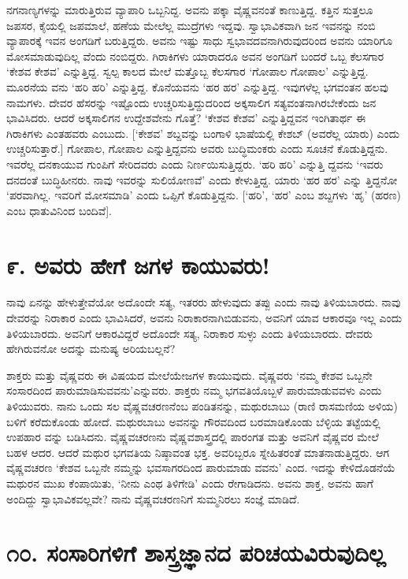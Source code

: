 ನಗನಾಣ್ಯಗಳನ್ನು ಮಾರುತ್ತಿರುವ ವ್ಯಾಪಾರಿ ಒಬ್ಬನಿದ್ದ. ಅವನು ಪಕ್ಕಾ ವೈಷ್ಣವನಂತೆ ಕಾಣುತ್ತಿದ್ದ. ಕತ್ತಿನ ಸುತ್ತಲೂ ಜಪಸರ, ಕೈಯಲ್ಲಿ ಜಪಮಾಲೆ, ಹಣೆಯ ಮೇಲೆಲ್ಲ ಮುದ್ರೆಗಳು ಇದ್ದವು. ಸ್ವಾಭಾವಿಕವಾಗಿ ಜನ ಇವನನ್ನು ನಂಬಿ ವ್ಯಾಪಾರಕ್ಕೆ ಇವನ ಅಂಗಡಿಗೆ ಬರುತ್ತಿದ್ದರು. ಅವನು ಇಷ್ಟು ಸಾಧು ಸ್ವಭಾವದವನಾಗಿರುವುದರಿಂದ ಅವನು ಯಾರಿಗೂ ಮೋಸಮಾಡುವುದಿಲ್ಲ ವೆಂದು ನಂಬಿದ್ದರು. ಗಿರಾಕಿಗಳು ಯಾರಾದರೂ ಅವನ ಅಂಗಡಿಗೆ ಬಂದರೆ ಒಬ್ಬ ಕೆಲಸಗಾರ ‘ಕೇಶವ ಕೇಶವ’ ಎನ್ನುತ್ತಿದ್ದ. ಸ್ವಲ್ಪ ಕಾಲದ ಮೇಲೆ ಮತ್ತೊಬ್ಬ ಕೆಲಸಗಾರ ‘ಗೋಪಾಲ ಗೋಪಾಲ’ ಎನ್ನುತ್ತಿದ್ದ. ಮೂರನೆಯ ವನು ‘ಹರಿ ಹರಿ’ ಎನ್ನುತ್ತಿದ್ದ. ಕೊನೆಯವನು ‘ಹರ ಹರ’ ಎನ್ನುತ್ತಿದ್ದ. ಇವುಗಳೆಲ್ಲ ಭಗವಂತನ ಹಲವು ನಾಮಗಳು. ದೇವರ ಹೆಸರನ್ನು ಇಷ್ಟೊಂದು ಉಚ್ಚರಿಸುತ್ತಿದ್ದುದರಿಂದ ಅಕ್ಕಸಾಲಿಗ ಸತ್ಯವಂತನಾಗಿರಬೇಕೆಂದು ಜನ ಭಾವಿಸಿದರು. ಆದರೆ ಅಕ್ಕಸಾಲಿಗನ ಉದ್ದೇಶವೇನು ಗೊತ್ತೆ? ‘ಕೇಶವ ಕೇಶವ’ ಎನ್ನುತ್ತಿದ್ದವನ ಇಂಗಿತಾರ್ಥ ಈ ಗಿರಾಕಿಗಳು ಎಂತಹವರು ಎಂಬುದು. [‘ಕೇಶವ’ ಶಬ್ದವನ್ನು ಬಂಗಾಳಿ ಭಾಷೆಯಲ್ಲಿ ಕೇಶಬ್ (ಅವರೆಲ್ಲ ಯಾರು) ಎಂದು ಉಚ್ಚರಿಸುತ್ತಾರೆ.] ಗೋಪಾಲ, ಗೋಪಾಲ ಎನ್ನುತ್ತಿದ್ದವನು ಅವರು ಬುದ್ಧಿಮಂಕರು ಎಂದು ಸೂಚನೆ ಕೊಡುತ್ತಿದ್ದನು. ಇವರೆಲ್ಲ ದನಕಾಯುವ ಗುಂಪಿಗೆ ಸೇರಿದವರು ಎಂದು ನಿರ್ಣಯಿಸುತ್ತಿದ್ದರು. ‘ಹರಿ ಹರಿ’ ಎನ್ನುತ್ತಿ ದ್ದವನು ‘ಇವರು ದನದಂತೆ ಬುದ್ಧಿಹೀನರು. ನಾವು ಇವರನ್ನು ಸುಲಿಯೋಣವೆ’ ಎಂದು ಕೇಳುತ್ತಿದ್ದ. ಯಾರು ‘ಹರ ಹರ’ ಎನ್ನು ತ್ತಿದ್ದನೋ ‘ಪರವಾಗಿಲ್ಲ. ಇವರಿಗೆ ಮೋಸಮಾಡಿ’ ಎಂದು ಒಪ್ಪಿಗೆ ಕೊಡುತ್ತಿದ್ದನು. [‘ಹರಿ’, ‘ಹರ’ ಎಂಬ ಶಬ್ದಗಳು ‘ಹೃ’ (ಹರಣ) ಎಂಬ ಧಾತುವಿನಿಂದ ಬಂದಿವೆ].


\section{\num{೯.} ಅವರು ಹೇಗೆ ಜಗಳ ಕಾಯುವರು!}

ನಾವು ಏನನ್ನು ಹೇಳುತ್ತೇವೆಯೋ ಅದೊಂದೇ ಸತ್ಯ, ಇತರರು ಹೇಳುವುದು ತಪ್ಪು ಎಂದು ನಾವು ತಿಳಿಯಬಾರದು. ನಾವು ದೇವರನ್ನು ನಿರಾಕಾರ ಎಂದು ಭಾವಿಸಿದರೆ, ಅವನು ನಿರಾಕಾರನಾಗಿಬಿಡುವನು, ಅವನಿಗೆ ಯಾವ ಆಕಾರವೂ ಇಲ್ಲ ಎಂದು ತಿಳಿಯಬಾರದು. ಅವನಿಗೆ ಆಕಾರವಿದ್ದರೆ ಅದೊಂದೇ ಸತ್ಯ, ನಿರಾಕಾರ ಸುಳ್ಳು ಎಂದು ತಿಳಿಯಬಾರದು. ದೇವರು ಹೇಗಿರುವನೋ ಅದನ್ನು ಮನುಷ್ಯ ಅರಿಯಬಲ್ಲನೆ?

ಶಾಕ್ತರು ಮತ್ತು ವೈಷ್ಣವರು ಈ ವಿಷಯದ ಮೇಲೆಯೇಜಗಳ ಕಾಯುವುದು. ವೈಷ್ಣವರು ‘ನಮ್ಮ ಕೇಶವ ಒಬ್ಬನೇ ಸಂಸಾರದಿಂದ ಪಾರುಮಾಡಿಸುವವನು’ಎನ್ನುವರು. ಶಾಕ್ತರು ನಮ್ಮ ಭಗವತಿಯೊಬ್ಬಳೆ ಪಾರುಮಾಡುವವಳು ಎಂದು ತಿಳಿಯುವರು. ನಾನು ಒಂದು ಸಲ ವೈಷ್ಣವಚರಣನೆಂಬ ಪಂಡಿತನನ್ನು, ಮಥುರಬಾಬು (ರಾಣಿ ರಾಸಮಣಿಯ ಅಳಿಯ) ಬಳಿಗೆ ಕರೆದುಕೊಂಡು ಹೋದೆ. ಮಥುರಬಾಬು ಅವನನ್ನು ಗೌರವದಿಂದ ಬರಮಾಡಿಕೊಂಡು ಬೆಳ್ಳಿಯ ತಟ್ಟೆಯಲ್ಲಿ ಉಪಹಾರ ವನ್ನು ಬಡಿಸಿದನು. ವೈಷ್ಣವಚರಣನು ವೈಷ್ಣವಶಾಸ್ತ್ರದಲ್ಲಿ ಪಾರಂಗತ ಮತ್ತು ಅವನಿಗೆ ವೈಷ್ಣವರ ಮೇಲೆ ಬಹಳ ಆದರ. ಆದರೆ ಮಥುರ ಭಗವತಿಯ ನಿಷ್ಠಾವಂತ ಭಕ್ತ. ಅವರಿಬ್ಬರೂ ಸ್ನೇಹಿತರಂತೆ ಮಾತನಾಡುತ್ತಿದ್ದರು. ಆಗ ವೈಷ್ಣವಚರಣ ‘ಕೇಶವ ಒಬ್ಬನೇ ನಮ್ಮನ್ನು ಭವಸಾಗರದಿಂದ ಪಾರುಮಾಡು ವವನು’ ಎಂದ. ಇದನ್ನು ಕೇಳಿದೊಡನೆಯೆ ಮಥುರನ ಮುಖ ಕೆಂಪಾಯಿತು, ‘ನೀನು ಎಂಥ ತಿಳಿಗೇಡಿ’ ಎಂದು ರೇಗಾಡಿದನು. ಅವನು ಶಾಕ್ತ, ಅವನು ಹಾಗೆ ಅಂದಿದ್ದು ಸ್ವಾಭಾವಿಕವಲ್ಲವೇ? ನಾನು ವೈಷ್ಣವಚರಣನಿಗೆ ಸುಮ್ಮನಿರಲು ಸಂಜ್ಞೆ ಮಾಡಿದೆ.


\section{\num{೧೦.} ಸಂಸಾರಿಗಳಿಗೆ ಶಾಸ್ತ್ರಜ್ಞಾನದ ಪರಿಚಯವಿರುವುದಿಲ್ಲ}

